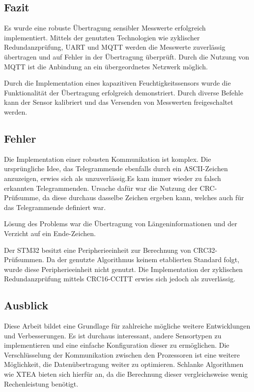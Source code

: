 \subsection{Fazit}
Es wurde eine robuste Übertragung sensibler Messwerte erfolgreich implementiert. Mittels der genutzten Technologien wie zyklischer Redundanzprüfung, \ac{UART} und \ac{MQTT}
werden die Messwerte zuverlässig übertragen und auf Fehler in der Übertragung überprüft. Durch die Nutzung von \ac{MQTT} ist die Anbindung an ein übergeordnetes 
Netzwerk möglich. 

\smallskip

Durch die Implementation eines kapazitiven Feuchtigkeitssensors wurde die Funktionalität der Übertragung erfolgreich demonstriert. Durch diverse Befehle kann der Sensor
kalibriert und das Versenden von Messwerten freigeschaltet werden.

\subsection{Fehler}
Die Implementation einer robusten Kommunikation ist komplex. Die ursprüngliche Idee, das Telegrammende ebenfalls durch ein \ac{ASCII}-Zeichen
anzuzeigen, erwies sich als unzuverlässig.Es kam immer wieder zu falsch erkannten Telegrammenden. Ursache dafür war die Nutzung der CRC-Prüfsumme,
da diese durchaus dasselbe Zeichen ergeben kann, welches auch für das Telegrammende definiert war. 

\smallskip

Lösung des Problems war die Übertragung von Längeninformationen und der Verzicht auf ein Ende-Zeichen.

\smallskip

Der STM32 besitzt eine Peripherieeinheit zur Berechnung von CRC32-Prüfsummen. Da der genutzte
Algorithmus keinem etablierten Standard folgt, wurde diese Peripherieeinheit nicht genutzt. Die Implementation der zyklischen Redundanzprüfung mittels 
CRC16-CCITT erwies sich jedoch als zuverlässig.

\subsection{Ausblick}
Diese Arbeit bildet eine Grundlage für zahlreiche mögliche weitere Entwicklungen und Verbesserungen. Es ist durchaus interessant, andere Sensortypen zu implementieren 
und eine einfache Konfiguration dieser zu ermöglichen. Die Verschlüsselung der Kommunikation zwischen den Prozessoren ist eine weitere Möglichkeit, die Datenübertragung
weiter zu optimieren. Schlanke Algorithmen wie XTEA bieten sich hierfür an, da die Berechnung dieser vergleichsweise wenig Rechenleistung benötigt.

